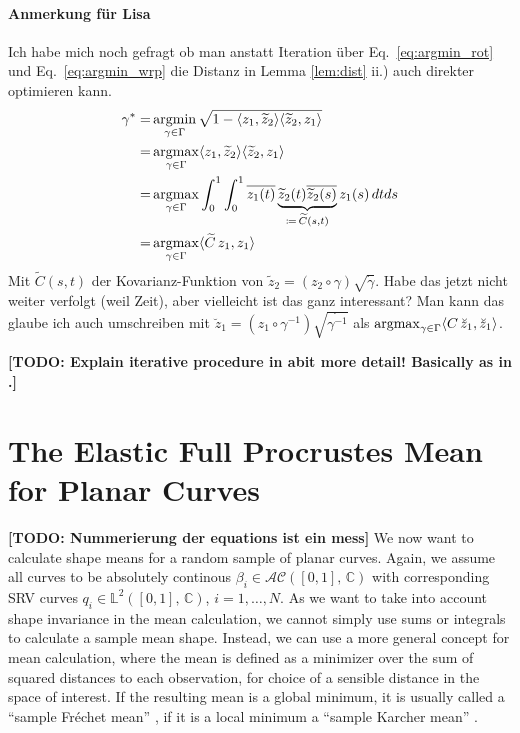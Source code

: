 \paragraph{Anmerkung für Lisa}
Ich habe mich noch gefragt ob man anstatt Iteration über Eq.\ \ref{eq:argmin_rot} und Eq.\ \ref{eq:argmin_wrp} die Distanz in Lemma \ref{lem:dist} ii.) auch direkter optimieren kann.
\begin{align*}
  \gamma^* = & \operatorname*{argmin}_{\gamma \in \Gamma} \sqrt{1 - \langle z_1, \widetilde z_2 \rangle \langle \widetilde z_2, z_1 \rangle } \\
    = & \operatorname*{argmax}_{\gamma \in \Gamma} \langle z_1, \widetilde z_2 \rangle \langle \widetilde z_2, z_1 \rangle \\
    = & \operatorname*{argmax}_{\gamma \in \Gamma} \int_0^1 \int_0^1
    \overline{z_1(t)} \underbrace{\widetilde z_2(t) \overline{\widetilde z_2(s)}}_{\coloneqq \, {\widetilde C}(s,t)} z_1(s) \, dt ds \\
    = & \operatorname*{argmax}_{\gamma \in \Gamma} \langle \widetilde C \, z_1, z_1 \rangle
\end{align*}
Mit $\widetilde C(s,t)$ der Kovarianz-Funktion von $\widetilde z_2 = (z_2 \circ \gamma) \sqrt{\dot\gamma}$.
Habe das jetzt nicht weiter verfolgt (weil Zeit), aber vielleicht ist das ganz interessant?
Man kann das glaube ich auch umschreiben mit $\breve z_1 = (z_1 \circ \gamma^{-1}) \sqrt{\dot{\gamma^{-1}}}$ als $\operatorname*{argmax}_{\gamma \in \Gamma} \langle C \, \breve z_1, \breve z_1 \rangle$.

\textbf{[TODO: Explain iterative procedure in abit more detail! Basically as in \cite{SrivastavaEtAl2011}.]}


\section{The Elastic Full Procrustes Mean for Planar Curves}
\textbf{[TODO: Nummerierung der equations ist ein mess]}
We now want to calculate shape means for a random sample of planar curves.
Again, we assume all curves to be absolutely continous $\beta_i \in \mathcal{AC}([0,1],\, \mathbb{C})$ with corresponding SRV curves $q_i \in \mathbb{L}^2([0,1],\, \mathbb{C})$, $i=1,\dots,N$.
As we want to take into account shape invariance in the mean calculation, we cannot simply use sums or integrals to calculate a sample mean shape.
Instead, we can use a more general concept for mean calculation, where the mean is defined as a minimizer over the sum of squared distances to each observation, for choice of a sensible distance in the space of interest.
If the resulting mean is a global minimum, it is usually called a \enquote{sample Fr\'echet mean} \parencite{Frechet1948}, if it is a local minimum a \enquote{sample Karcher mean} \parencite{Karcher1977} \parencite[see][111]{DrydenMardia2016}.

